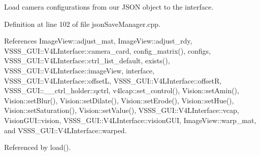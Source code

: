 Load camera configurations from our J\+S\+ON object to the interface. 



Definition at line 102 of file json\+Save\+Manager.\+cpp.



References Image\+View\+::adjust\+\_\+mat, Image\+View\+::adjust\+\_\+rdy, V\+S\+S\+S\+\_\+\+G\+U\+I\+::\+V4\+L\+Interface\+::camera\+\_\+card, config\+\_\+matrix(), configs, V\+S\+S\+S\+\_\+\+G\+U\+I\+::\+V4\+L\+Interface\+::ctrl\+\_\+list\+\_\+default, exists(), V\+S\+S\+S\+\_\+\+G\+U\+I\+::\+V4\+L\+Interface\+::image\+View, interface, V\+S\+S\+S\+\_\+\+G\+U\+I\+::\+V4\+L\+Interface\+::offsetL, V\+S\+S\+S\+\_\+\+G\+U\+I\+::\+V4\+L\+Interface\+::offsetR, V\+S\+S\+S\+\_\+\+G\+U\+I\+::\+\_\+\+\_\+ctrl\+\_\+holder\+::qctrl, v4lcap\+::set\+\_\+control(), Vision\+::set\+Amin(), Vision\+::set\+Blur(), Vision\+::set\+Dilate(), Vision\+::set\+Erode(), Vision\+::set\+Hue(), Vision\+::set\+Saturation(), Vision\+::set\+Value(), V\+S\+S\+S\+\_\+\+G\+U\+I\+::\+V4\+L\+Interface\+::vcap, Vision\+G\+U\+I\+::vision, V\+S\+S\+S\+\_\+\+G\+U\+I\+::\+V4\+L\+Interface\+::vision\+G\+UI, Image\+View\+::warp\+\_\+mat, and V\+S\+S\+S\+\_\+\+G\+U\+I\+::\+V4\+L\+Interface\+::warped.



Referenced by load().


